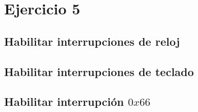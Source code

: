 \section{Ejercicio 5}

\subsection{Habilitar interrupciones de reloj}

\subsection{Habilitar interrupciones de teclado}

\subsection{Habilitar interrupción $0x66$}

